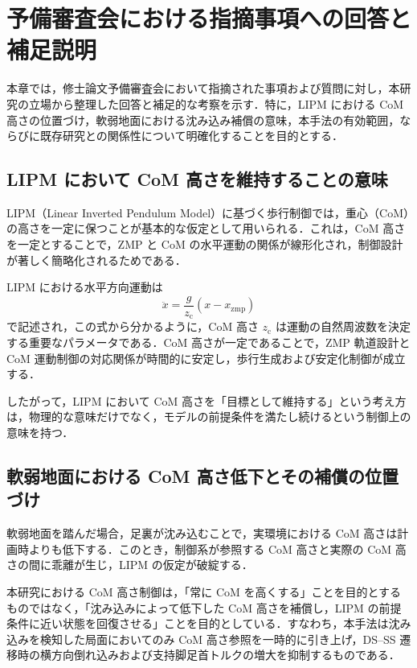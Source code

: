 \chapter{予備審査会における指摘事項への回答と補足説明}
\label{chap:qa_discussion}

本章では，修士論文予備審査会において指摘された事項および質問に対し，本研究の立場から整理した回答と補足的な考察を示す．特に，LIPM における CoM 高さの位置づけ，軟弱地面における沈み込み補償の意味，本手法の有効範囲，ならびに既存研究との関係性について明確化することを目的とする．

\section{LIPM において CoM 高さを維持することの意味}
\label{sec:qa_com_height_meaning}

LIPM（Linear Inverted Pendulum Model）に基づく歩行制御では，重心（CoM）の高さを一定に保つことが基本的な仮定として用いられる．これは，CoM 高さを一定とすることで，ZMP と CoM の水平運動の関係が線形化され，制御設計が著しく簡略化されるためである．

LIPM における水平方向運動は
\begin{equation}
\ddot{x} = \frac{g}{z_{\mathrm{c}}}(x - x_{\mathrm{zmp}})
\end{equation}
で記述され，この式から分かるように，CoM 高さ $z_{\mathrm{c}}$ は運動の自然周波数を決定する重要なパラメータである．CoM 高さが一定であることで，ZMP 軌道設計と CoM 運動制御の対応関係が時間的に安定し，歩行生成および安定化制御が成立する．

したがって，LIPM において CoM 高さを「目標として維持する」という考え方は，物理的な意味だけでなく，モデルの前提条件を満たし続けるという制御上の意味を持つ．

\section{軟弱地面における CoM 高さ低下とその補償の位置づけ}
\label{sec:qa_sink_compensation}

軟弱地面を踏んだ場合，足裏が沈み込むことで，実環境における CoM 高さは計画時よりも低下する．このとき，制御系が参照する CoM 高さと実際の CoM 高さの間に乖離が生じ，LIPM の仮定が破綻する．

本研究における CoM 高さ制御は，「常に CoM を高くする」ことを目的とするものではなく，「沈み込みによって低下した CoM 高さを補償し，LIPM の前提条件に近い状態を回復させる」ことを目的としている．すなわち，本手法は沈み込みを検知した局面においてのみ CoM 高さ参照を一時的に引き上げ，DS--SS 遷移時の横方向倒れ込みおよび支持脚足首トルクの増大を抑制するものである．

